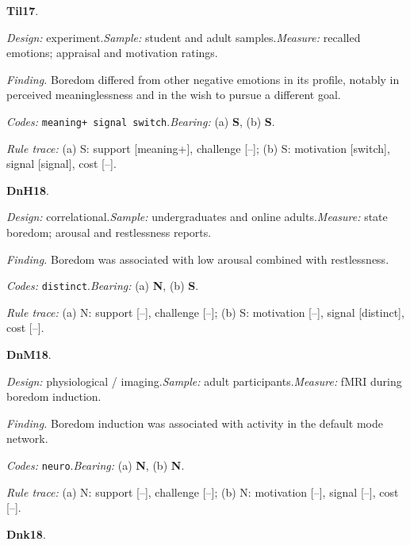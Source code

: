 \medskip
{}
\noindent\textbf{Til17}\enspace \citet{vanTilburgIgou2017}.\par
{\small\noindent\textit{Design:} experiment.\quad \textit{Sample:} student and adult samples.\quad \textit{Measure:} recalled emotions; appraisal and motivation ratings.\par
\noindent\textit{Finding.} Boredom differed from other negative emotions in its profile, notably in perceived meaninglessness and in the wish to pursue a different goal.\par
\noindent\textit{Codes:} \texttt{meaning+ signal switch}.\quad \textit{Bearing:} (a) \textbf{S}, (b) \textbf{S}.\par
\noindent\textit{Rule trace:} (a) S: support {[}meaning+{]}, challenge {[}--{]}; (b) S: motivation {[}switch{]}, signal {[}signal{]}, cost {[}--{]}.\par}
\medskip
{}
\noindent\textbf{DnH18}\enspace \citet{Danckert2018restless}.\par
{\small\noindent\textit{Design:} correlational.\quad \textit{Sample:} undergraduates and online adults.\quad \textit{Measure:} state boredom; arousal and restlessness reports.\par
\noindent\textit{Finding.} Boredom was associated with low arousal combined with restlessness.\par
\noindent\textit{Codes:} \texttt{distinct}.\quad \textit{Bearing:} (a) \textbf{N}, (b) \textbf{S}.\par
\noindent\textit{Rule trace:} (a) N: support {[}--{]}, challenge {[}--{]}; (b) S: motivation {[}--{]}, signal {[}distinct{]}, cost {[}--{]}.\par}
\medskip
{}
\noindent\textbf{DnM18}\enspace \citet{DanckertMerrifield2018}.\par
{\small\noindent\textit{Design:} physiological / imaging.\quad \textit{Sample:} adult participants.\quad \textit{Measure:} fMRI during boredom induction.\par
\noindent\textit{Finding.} Boredom induction was associated with activity in the default mode network.\par
\noindent\textit{Codes:} \texttt{neuro}.\quad \textit{Bearing:} (a) \textbf{N}, (b) \textbf{N}.\par
\noindent\textit{Rule trace:} (a) N: support {[}--{]}, challenge {[}--{]}; (b) N: motivation {[}--{]}, signal {[}--{]}, cost {[}--{]}.\par}
\medskip
{}
\noindent\textbf{Dnk18}\enspace \citet{DanckertMugon2018}.\par
